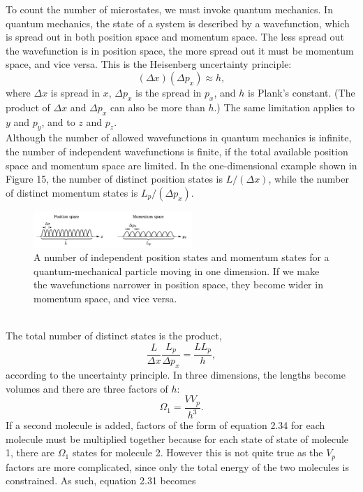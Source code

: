 \documentclass[11pt]{exam}
\begin{document}
To count the number of microstates, we must invoke quantum mechanics. In quantum mechanics, the state of a system is described by a wavefunction, which is spread out in both position space and momentum space. The less spread out the wavefunction is in position space, the more spread out it must be momentum space, and vice versa. This is the Heisenberg uncertainty principle:
\begin{equation}\tag{2.32}
(\Delta x)(\Delta p_x) \approx h,
\end{equation}
where $\Delta x$ is spread in $x$, $\Delta p_x$ is the spread in $p_x$, and $h$ is Plank's constant. (The product of $\Delta x$ and $\Delta p_x$ can also be more than $h$.) The same limitation applies to $y$ and $p_y$, and to $z$ and $p_z$.\\
\hspace*{10mm}Although the number of allowed wavefunctions in quantum mechanics is infinite, the number of independent wavefunctions is finite, if the total available position space and momentum space are limited. In the one-dimensional example shown in Figure 15, the number of distinct position states is $L/(\Delta x)$, while the number of distinct momentum states is $L_p/(\Delta p_x)$.
\begin{figure}[htp]
    \centering
    \includegraphics[width=6cm]{figure15.png}
    \caption{A number of independent position states and momentum states for a quantum-mechanical particle moving in one dimension. If we make the wavefunctions narrower in position space, they become wider in momentum space, and vice versa.}
\label{fig:momentum-position-space}
\end{figure}\\
The total number of distinct states is the product, 
\begin{equation}\tag{2.33}
\frac{L}{\Delta x}\frac{L_p}{\Delta p_x}=\frac{LL_p}{h},    
\end{equation}
according to the uncertainty principle. In three dimensions, the lengths become volumes and there are three factors of $h$:
\begin{equation}\tag{2.34}
\Omega_1 = \frac{VV_p}{h^3}.    
\end{equation}
\hspace*{19mm}If a second molecule is added, factors of the form of equation 2.34 for each molecule must be multiplied together because for each state of state of molecule 1, there are $\Omega_1$ states for molecule 2. However this is not quite true as the $V_p$ factors are  more complicated, since only the total energy of the two molecules is constrained. As such, equation 2.31 becomes 
\end{document}
